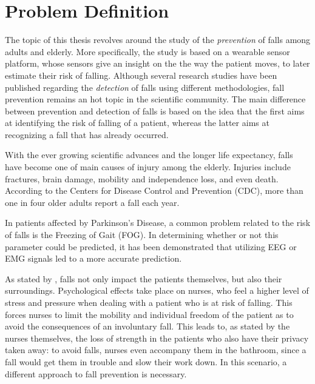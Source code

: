 \section{Problem Definition}
The topic of this thesis revolves around the study of the \textit{prevention} of falls among adults and elderly. More specifically, the study is based on a wearable sensor platform, whose sensors give an insight on the the way the patient moves, to later estimate their risk of falling. 
Although several research studies have been published regarding the \textit{detection} of falls using different methodologies, fall prevention remains an hot topic in the scientific community. The main difference between prevention and detection of falls is based on the idea that the first aims at identifying the risk of falling of a patient, whereas the latter aims at recognizing a fall that has already occurred.

With the ever growing scientific advances and the longer life expectancy, falls have become one of main causes of injury among the elderly. 
Injuries include fractures, brain damage, mobility and independence loss, and even death. According to the Centers for Disease Control and Prevention (CDC), more than one in four older adults report a fall each year. 

In patients affected by Parkinson's Disease, a common problem related to the risk of falls is the Freezing of Gait (FOG). In determining whether or not this parameter could be predicted, it has been demonstrated that utilizing EEG or EMG signals led to a more accurate prediction. 

As stated by \cite{ImpactFallNurses}, falls not only impact the patients themselves, but also their surroundings. Psychological effects take place on nurses, who feel a higher level of stress and pressure when dealing with a patient who is at risk of falling. This forces nurses to limit the mobility and individual freedom of the patient as to avoid the consequences of an involuntary fall. This leads to, as stated by the nurses themselves, the loss of strength in the patients who also have their privacy taken away: to avoid falls, nurses even accompany them in the bathroom, since a fall would get them in trouble and slow their work down. 
In this scenario, a different approach to fall prevention is necessary.

